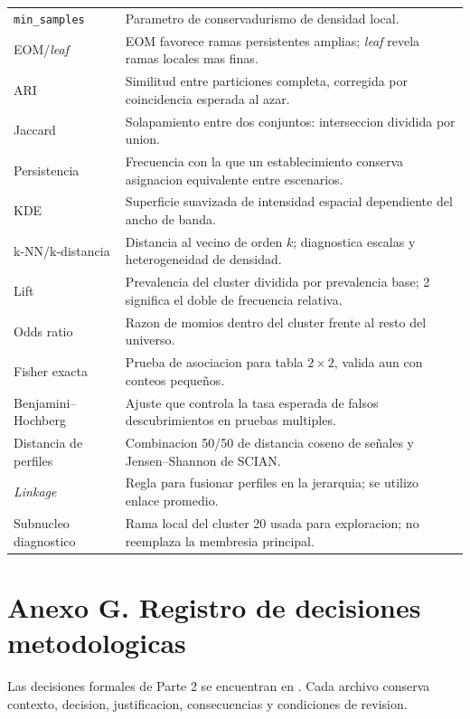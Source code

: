 \documentclass[11pt,letterpaper]{article}
\begin{document}
\begin{longtable}{p{}p{}}
\texttt{min\_samples} & Parametro de conservadurismo de densidad local. \\
EOM/\emph{leaf} & EOM favorece ramas persistentes amplias; \emph{leaf} revela ramas locales mas finas. \\
ARI & Similitud entre particiones completa, corregida por coincidencia esperada al azar. \\
Jaccard & Solapamiento entre dos conjuntos: interseccion dividida por union. \\
Persistencia & Frecuencia con la que un establecimiento conserva asignacion equivalente entre escenarios. \\
KDE & Superficie suavizada de intensidad espacial dependiente del ancho de banda. \\
k-NN/k-distancia & Distancia al vecino de orden $k$; diagnostica escalas y heterogeneidad de densidad. \\
Lift & Prevalencia del cluster dividida por prevalencia base; 2 significa el doble de frecuencia relativa. \\
Odds ratio & Razon de momios dentro del cluster frente al resto del universo. \\
Fisher exacta & Prueba de asociacion para tabla $2\times2$, valida aun con conteos pequeños. \\
Benjamini--Hochberg & Ajuste que controla la tasa esperada de falsos descubrimientos en pruebas multiples. \\
Distancia de perfiles & Combinacion 50/50 de distancia coseno de señales y Jensen--Shannon de SCIAN. \\
\emph{Linkage} & Regla para fusionar perfiles en la jerarquia; se utilizo enlace promedio. \\
Subnucleo diagnostico & Rama local del cluster 20 usada para exploracion; no reemplaza la membresia principal. \\
\bottomrule
\end{longtable}

\section{Anexo G. Registro de decisiones metodologicas}

Las decisiones formales de Parte 2 se encuentran en . Cada archivo conserva contexto, decision, justificacion, consecuencias y condiciones de revision.
\end{document}
